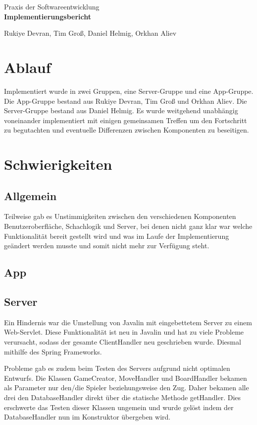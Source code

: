 \documentclass[parskip=full]{scrartcl}
\begin{document}
	\begin{titlepage}
		
		\centering
		\vspace*{0.2\textheight}
		{\Large Praxis der Softwareentwicklung}\\[\baselineskip]
		\vspace{2cm}
		{\Huge \textbf{Implementierungsbericht}}\\[\baselineskip]\par
		\vspace{2cm}
		{\LARGE Rukiye Devran, Tim Groß, Daniel Helmig, Orkhan Aliev}\par		
		\newpage	
		\tableofcontents
		\pagebreak
		
	\end{titlepage}
	\section{Ablauf}
	Implementiert wurde in zwei Gruppen, eine Server-Gruppe und eine App-Gruppe.
	Die App-Gruppe bestand aus Rukiye Devran, Tim Groß und Orkhan Aliev.
	Die Server-Gruppe bestand aus Daniel Helmig.
	Es wurde weitgehend unabhängig voneinander implementiert mit einigen gemeinsamen Treffen um den Fortschritt zu begutachten und eventuelle Differenzen zwischen Komponenten zu beseitigen.
	\section{Schwierigkeiten}
		\subsection{Allgemein} 
		Teilweise gab es Unstimmigkeiten zwischen den verschiedenen Komponenten Benutzeroberfläche, Schachlogik und Server, bei denen nicht ganz klar war welche Funktionalität bereit gestellt wird und was im Laufe der Implementierung geändert werden musste und somit nicht mehr zur Verfügung steht. 
		\subsection{App}
		\subsection{Server}
		Ein Hindernis war die Umstellung von Javalin mit eingebettetem Server zu einem Web-Servlet. Diese Funktionalität ist neu in Javalin und hat zu viele Probleme verursacht, sodass der gesamte ClientHandler neu geschrieben wurde.
		Diesmal mithilfe des Spring Frameworks.
		
		Probleme gab es zudem beim Testen des Servers aufgrund nicht optimalen Entwurfs.
		Die Klassen GameCreator, MoveHandler und BoardHandler bekamen als Parameter nur den/die Spieler beziehungsweise den Zug. Daher bekamen alle drei den DatabaseHandler direkt über die statische Methode getHandler. Dies erschwerte das Testen dieser Klassen ungemein und wurde gelöst indem der DatabaseHandler nun im Konstruktor übergeben wird.
\end{document}
